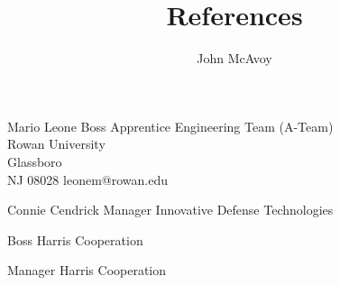 \documentclass{classes/reference}
\title{References}
\author{John McAvoy}
\date{}
\begin{document}
\maketitle

\Contact
{Mario Leone}
{Boss}
{Apprentice Engineering Team (A-Team) \\ Rowan University \\ Glassboro \\ NJ 08028}
{leonem@rowan.edu}
{}

\Contact
{Connie Cendrick}
{Manager}
{Innovative Defense Technologies}
{}
{}

{Boss}
{Harris Cooperation}
{}
{}

{Manager}
{Harris Cooperation}
{}
{}
\end{document}
